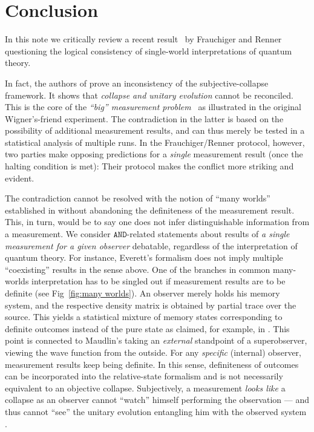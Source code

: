 \documentclass[aps,pra,12pt]{revtex4-2}
\newcommand{\AND}{\mathtt{AND}}
\theoremstyle{definition}
\theoremstyle{remark}
\begin{document}
 \section{Conclusion}
\noindent
In this note we critically review a recent result~\cite{FrRen} by Frauchiger and Renner questioning the logical consistency of single-world interpretations of quantum theory.

In fact, the authors of \cite{FrRen} prove an inconsistency of the subjective-collapse framework.
It shows that \emph{collapse and unitary evolution} cannot be reconciled. 
This is the core of the \emph{``big'' measurement problem}~\cite{brukner2015quantum} as illustrated in the original Wigner's-friend experiment.
The contradiction in the latter is based on the possibility of additional measurement results, and can thus merely be tested in a statistical analysis of multiple runs.
In the Frauchiger/Renner protocol, however, two parties make opposing predictions for a \emph{single} measurement result (once the halting condition is met):
Their protocol makes the conflict more striking and evident.

The contradiction cannot be resolved with the notion of ``many worlds'' established in \cite{FrRen} without abandoning the definiteness of the measurement result. 
This, in turn, would be to say one does not infer distinguishable information from a measurement. 
We consider $\AND$-related statements about results of \emph{a single measurement for a given observer} debatable, regardless of the interpretation of quantum theory. 
For instance, Everett's formalism does not imply multiple ``coexisting'' results in the sense above.
One of the branches in common many-worlds interpretation has to be singled out if measurement results are to be definite (see Fig~\ref{fig:many worlds}).
An observer merely holds his memory system, and the respective density matrix is obtained by partial trace over the source. This yields a statistical mixture of memory states corresponding to definite outcomes instead of the pure state as claimed, for example, in \cite{Maudlin95}.  
This point is connected to Maudlin's taking an \emph{external} standpoint of a superobserver, viewing the wave function from the outside.
For any \emph{specific} (internal) observer, measurement results keep being definite.
In this sense, definiteness of outcomes can be incorporated into the relative-state formalism and is not necessarily equivalent to an objective collapse.
Subjectively, a measurement \emph{looks like} a collapse as an observer cannot ``watch'' himself performing the observation --- and thus cannot ``see'' the unitary evolution entangling him with the observed system \cite{filan2015would}. 
\end{document}
